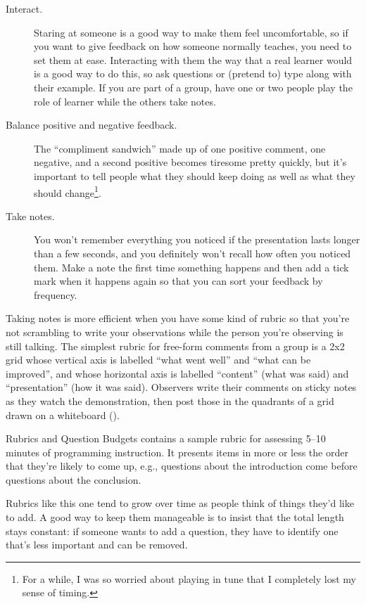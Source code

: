 \begin{description}

\item[Interact.]
  Staring at someone is a good way to make them feel uncomfortable,
  so if you want to give feedback on how someone normally teaches,
  you need to set them at ease.
  Interacting with them the way that a real learner would is a good way to do this,
  so ask questions or (pretend to) type along with their example.
  If you are part of a group,
  have one or two people play the role of learner
  while the others take notes.

\item[Balance positive and negative feedback.]
  The ``compliment sandwich'' made up of one positive comment,
  one negative,
  and a second positive
  becomes tiresome pretty quickly,
  but it's important to tell people what they should keep doing
  as well as what they should change\footnote{
    For a while,
    I was so worried about playing in tune that I completely lost my sense of timing.
  }.

\item[Take notes.]
  You won't remember everything you noticed
  if the presentation lasts longer than a few seconds,
  and you definitely won't recall how often you noticed them.
  Make a note the first time something happens
  and then add a tick mark when it happens again
  so that you can sort your feedback by frequency.

\end{description}

Taking notes is more efficient when you have some kind of rubric
so that you're not scrambling to write your observations
while the person you're observing is still talking.
The simplest rubric for free-form comments from a group
is a 2x2 grid whose vertical axis is labelled ``what went well'' and ``what can be improved'',
and whose horizontal axis is labelled ``content'' (what was said)
and ``presentation'' (how it was said).
Observers write their comments on sticky notes as they watch the demonstration,
then post those in the quadrants of a grid drawn on a whiteboard
().


\begin{aside}{Rubrics and Question Budgets}
   contains a sample rubric
  for assessing 5--10 minutes of programming instruction.
  It presents items in more or less the order that they're likely to come up,
  e.g.,
  questions about the introduction come before questions about the conclusion.

  Rubrics like this one
  tend to grow over time as people think of things they'd like to add.
  A good way to keep them manageable is to insist that
  the total length stays constant:
  if someone wants to add a question,
  they have to identify one that's less important and can be removed.
\end{aside}


